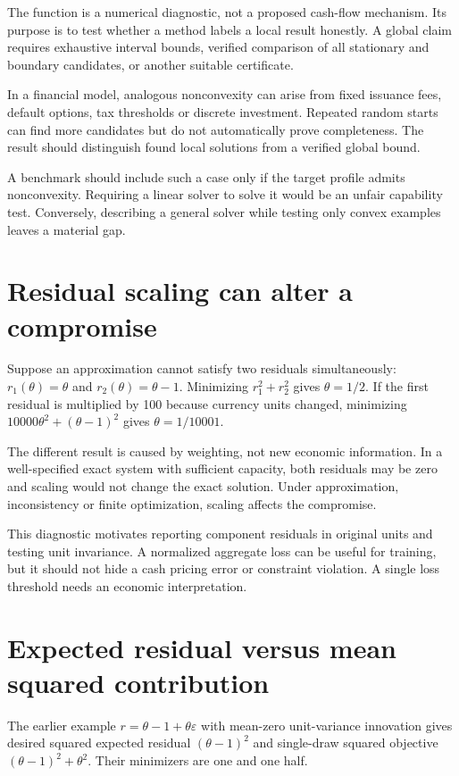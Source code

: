 The function is a numerical diagnostic, not a proposed cash-flow mechanism. Its purpose is to test whether a method labels a local result honestly. A global claim requires exhaustive interval bounds, verified comparison of all stationary and boundary candidates, or another suitable certificate.

In a financial model, analogous nonconvexity can arise from fixed issuance fees, default options, tax thresholds or discrete investment. Repeated random starts can find more candidates but do not automatically prove completeness. The result should distinguish found local solutions from a verified global bound.

A benchmark should include such a case only if the target profile admits nonconvexity. Requiring a linear solver to solve it would be an unfair capability test. Conversely, describing a general solver while testing only convex examples leaves a material gap.

\section{Residual scaling can alter a compromise}
Suppose an approximation cannot satisfy two residuals simultaneously: $r_1(\theta)=\theta$ and $r_2(\theta)=\theta-1$. Minimizing $r_1^2+r_2^2$ gives $\theta=1/2$. If the first residual is multiplied by 100 because currency units changed, minimizing $10000\theta^2+(\theta-1)^2$ gives $\theta=1/10001$.

The different result is caused by weighting, not new economic information. In a well-specified exact system with sufficient capacity, both residuals may be zero and scaling would not change the exact solution. Under approximation, inconsistency or finite optimization, scaling affects the compromise.

This diagnostic motivates reporting component residuals in original units and testing unit invariance. A normalized aggregate loss can be useful for training, but it should not hide a cash pricing error or constraint violation. A single loss threshold needs an economic interpretation.

\section{Expected residual versus mean squared contribution}
The earlier example $r=\theta-1+\theta\varepsilon$ with mean-zero unit-variance innovation gives desired squared expected residual $(\theta-1)^2$ and single-draw squared objective $(\theta-1)^2+\theta^2$. Their minimizers are one and one half.

